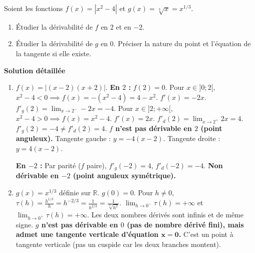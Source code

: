 \documentclass[11pt]{article}
\begin{document}
\begin{exoresolu}
Soient les fonctions $f(x) = |x^2 - 4|$ et $g(x) = \sqrt[3]{x} = x^{1/3}$.
\begin{enumerate}
    \item Étudier la dérivabilité de $f$ en $2$ et en $-2$.
    \item Étudier la dérivabilité de $g$ en $0$. Préciser la nature du point et l'équation de la tangente si elle existe.
\end{enumerate}
\tcblower
\textbf{Solution détaillée}
\begin{enumerate}
    \item $f(x) = |(x-2)(x+2)|$.
    \textbf{En $2$ :} $f(2)=0$.
    Pour $x \in ]0;2[$, $x^2-4 < 0 \implies f(x) = -(x^2-4) = 4-x^2$. $f'(x) = -2x$. $f'_g(2) = \lim_{x\to 2^-} -2x = -4$.
    Pour $x \in ]2; +\infty[$, $x^2-4 > 0 \implies f(x) = x^2-4$. $f'(x) = 2x$. $f'_d(2) = \lim_{x\to 2^+} 2x = 4$.
    $f'_g(2) = -4 \neq f'_d(2) = 4$. \textbf{$f$ n'est pas dérivable en $2$ (point anguleux).}
    Tangente gauche : $y = -4(x-2)$. Tangente droite : $y = 4(x-2)$.
    
    \textbf{En $-2$ :} Par parité ($f$ paire), $f'_g(-2) = 4$, $f'_d(-2) = -4$. \textbf{Non dérivable en $-2$ (point anguleux symétrique).}
    
    \item $g(x) = x^{1/3}$ définie sur $\mathbb{R}$. $g(0)=0$.
    Pour $h \neq 0$, $\tau(h) = \frac{h^{1/3}}{h} = h^{-2/3} = \frac{1}{h^{2/3}} = \frac{1}{\sqrt[3]{h^2}}$.
    $\lim_{h \to 0^-} \tau(h) = +\infty$ et $\lim_{h \to 0^+} \tau(h) = +\infty$.
    Les deux nombres dérivés sont infinis et de même signe.
    \textbf{$g$ n'est pas dérivable en $0$ (pas de nombre dérivé fini), mais admet une tangente verticale d'équation $\mathbf{x=0}$.}
    C'est un point à tangente verticale (pas un cuspide car les deux branches montent).
\end{enumerate}
\end{exoresolu}
\end{document}
